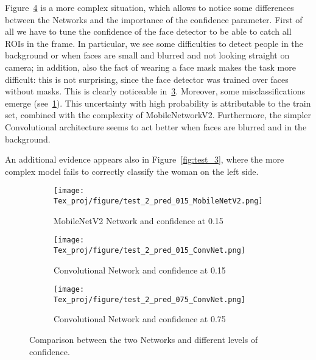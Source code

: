 \documentclass[10pt,twocolumn,letterpaper]{article}
\begin{document}
Figure~\ref{fig:test_2} is a more complex situation, which allows to notice some differences between the Networks and the importance of the confidence parameter. First of all we have to tune the confidence of the face detector to be able to catch all ROIs in the frame. In particular, we see some difficulties to detect people in the background or when faces are small and blurred and not looking straight on camera; in addition, also the fact of wearing a face mask makes the task more difficult: this is not surprising, since the face detector was trained over faces without masks. This is clearly noticeable in~\ref{fig:conv_75}.
Moreover, some misclassifications emerge (see~\ref{fig:mobnet_15}). This uncertainty with high probability is attributable to the train set, combined with the complexity of MobileNetworkV2. Furthermore, the simpler Convolutional architecture seems to act better when faces are blurred and in the background.

An additional evidence appears also in Figure~\ref{fig:test_3}, where the more complex model fails to correctly classify the woman on the left side.


\begin{figure}[htp]
    \centering
    \begin{subfigure}[b]{0.5\textwidth}
        \centering
        \texttt{[image: Tex\_proj/figure/test\_2\_pred\_015\_MobileNetV2.png]}
        \caption{MobileNetV2 Network and confidence at 0.15}
        \label{fig:mobnet_15}
    \end{subfigure}
    \begin{subfigure}[b]{0.5\textwidth}
        \centering
        \texttt{[image: Tex\_proj/figure/test\_2\_pred\_015\_ConvNet.png]}
        \caption{Convolutional Network and confidence at 0.15}
        \label{fig:conv_15}
    \end{subfigure}
    \begin{subfigure}[b]{0.5\textwidth}
        \centering
        \texttt{[image: Tex\_proj/figure/test\_2\_pred\_075\_ConvNet.png]}
        \caption{Convolutional Network and confidence at 0.75}
        \label{fig:conv_75}
    \end{subfigure}
    \caption{Comparison between the two Networks and different levels of confidence.}
    \label{fig:test_2}
\end{figure}
\end{document}
